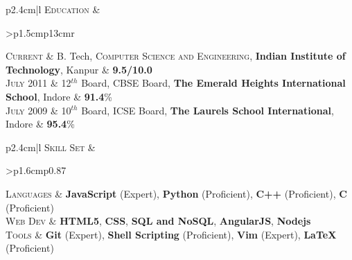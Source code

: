 \documentclass[a4paper]{article} %
\newcommand{\highlight}[2]{
    \begin{tabular}{p{2.4cm}|l}
        \textsc {\large #1} & #2
    \end{tabular}
}
\newcommand{\itemlist}[1]{
    \begin{tabular}{>{\raggedleft}p{1.6cm}p{0.87\linewidth}}
        #1
    \end{tabular}
}
\begin{document}
\highlight
    {Education}
    {
        \begin{tabular}{>{\raggedleft}p{1.5cm}p{13cm}r}

            \textsc{Current} & B. Tech, \textsc{Computer Science and Engineering},
                               \textbf{Indian Institute of Technology}, Kanpur
                             & \textbf{9.5/10.0}\\

            \textsc{July 2011} & 12$^{th}$ Board, \textsc{CBSE} Board,
                                 \textbf{The Emerald Heights International School}, Indore
                               & \textbf{91.4}\% \\

            \textsc{July 2009} & 10$^{th}$ Board, \textsc{ICSE} Board,
                                 \textbf{The Laurels School International}, Indore
                               & \textbf{95.4}\% \\

        \end{tabular}
    }

\highlight
    {Skill Set}
    {
        \itemlist {
                \textsc{\small Languages} %
                & \textbf{JavaScript} (Expert), \textbf{Python} (Proficient), \textbf{C++} (Proficient),
                  \textbf{C} (Proficient)\\
                \textsc{\small Web Dev} %
                & \textbf{HTML5}, \textbf{CSS}, \textbf{SQL and NoSQL}, \textbf{AngularJS}, \textbf{Nodejs}\\
                  \textsc{\small Tools} %
                & \textbf{Git} (Expert), \textbf{Shell Scripting} (Proficient), \textbf{Vim} (Expert),
                \textbf{LaTeX} (Proficient)\\
            }
    }

%
%
\end{document}
